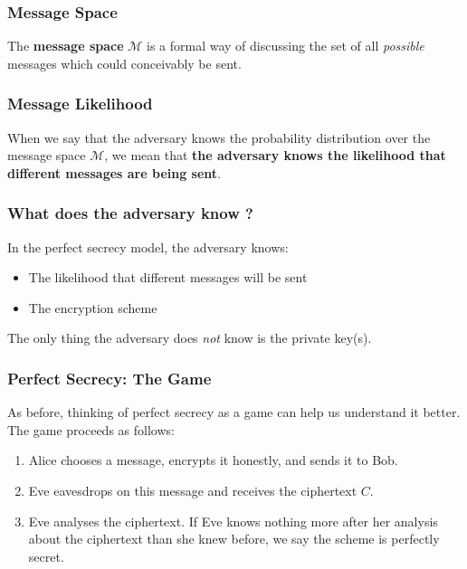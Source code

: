 \documentclass{beamer}
\newcommand{\<}{\langle}
\renewcommand{\>}{\rangle}
\begin{document}
\begin{frame}
\frametitle{Message Space}

The \textbf{message space} $\mathcal M$ is a formal way of discussing the set of all \emph{possible} messages which could conceivably be sent. 
\end{frame}

\begin{frame}
\frametitle{Message Likelihood}

When we say that the adversary knows the probability distribution over the message space $\mathcal M$, we mean that \textbf{the adversary knows the likelihood that different messages are being sent}.
\end{frame}


\begin{frame}
\frametitle{What does the adversary know ?}

In the perfect secrecy model, the adversary knows:
\begin{itemize}
\item The likelihood that different messages will be sent
\item The encryption scheme
\end{itemize}

The only thing the adversary does \emph{not} know is the private key(s).
\end{frame}


\begin{frame}
\frametitle{Perfect Secrecy: The Game}

As before, thinking of perfect secrecy as a game can help us understand it better. The game proceeds as follows:
\begin{enumerate}
\item Alice chooses a message, encrypts it honestly, and sends it to Bob.
\item Eve eavesdrops on this message and receives the ciphertext $C$. 
\item Eve analyses the ciphertext. If Eve knows nothing more after her analysis about the ciphertext than she knew before, we say the scheme is perfectly secret.
\end{enumerate}
\end{frame}
\end{document}
